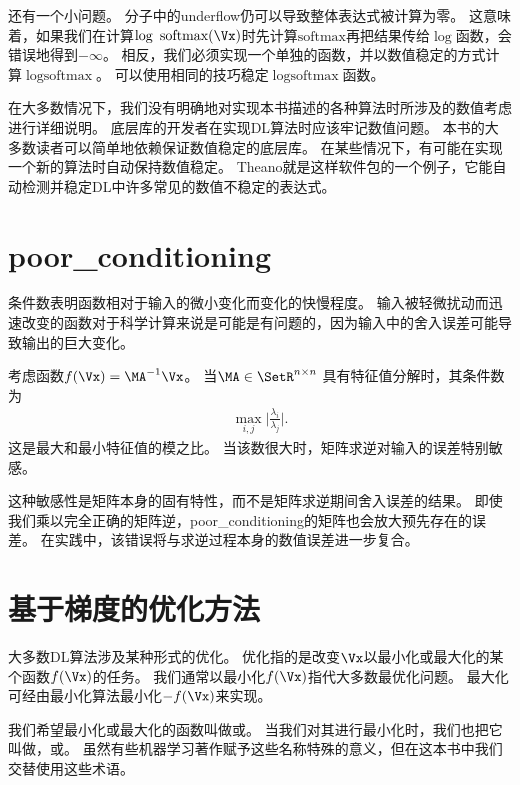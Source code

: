 还有一个小问题。
分子中的\gls{underflow}仍可以导致整体表达式被计算为零。
这意味着，如果我们在计算$\log ~\text{softmax}(\Vx)$时先计算$\text{softmax}$再把结果传给$\log$函数，会错误地得到$-\infty$。
相反，我们必须实现一个单独的函数，并以数值稳定的方式计算$\log \text{softmax}$。
可以使用相同的技巧稳定$\log \text{softmax}$函数。

在大多数情况下，我们没有明确地对实现本书描述的各种算法时所涉及的数值考虑进行详细说明。
底层库的开发者在实现\gls{DL}算法时应该牢记数值问题。
本书的大多数读者可以简单地依赖保证数值稳定的底层库。
在某些情况下，有可能在实现一个新的算法时自动保持数值稳定。
Theano\citep{bergstra+al:2010-scipy,Bastien-2012}就是这样软件包的一个例子，它能自动检测并稳定\gls{DL}中许多常见的数值不稳定的表达式。


\section{\gls{poor_conditioning}}
\label{sec:poor_conditioning}

条件数表明函数相对于输入的微小变化而变化的快慢程度。
输入被轻微扰动而迅速改变的函数对于科学计算来说是可能是有问题的，因为输入中的舍入误差可能导致输出的巨大变化。

考虑函数$f(\Vx) = \MA^{-1} \Vx$。
当$\MA \in \SetR^{n \times n}$ 具有特征值分解时，其条件数为
\begin{align}
 \underset{i,j}{\max} \Bigg| \frac{\lambda_i}{ \lambda_j} \Bigg|.
\end{align}
这是最大和最小特征值的模之比。
当该数很大时，矩阵求逆对输入的误差特别敏感。

这种敏感性是矩阵本身的固有特性，而不是矩阵求逆期间舍入误差的结果。
即使我们乘以完全正确的矩阵逆，\gls{poor_conditioning}的矩阵也会放大预先存在的误差。
在实践中，该错误将与求逆过程本身的数值误差进一步复合。



\section{基于梯度的优化方法}
\label{sec:gradient_based_optimization}

大多数\gls{DL}算法涉及某种形式的优化。
优化指的是改变$\Vx$以最小化或最大化的某个函数$f(\Vx)$的任务。
我们通常以最小化$f(\Vx)$指代大多数最优化问题。
最大化可经由最小化算法最小化$-f(\Vx)$来实现。

我们希望最小化或最大化的函数叫做或。
当我们对其进行最小化时，我们也把它叫做，或。
虽然有些机器学习著作赋予这些名称特殊的意义，但在这本书中我们交替使用这些术语。

